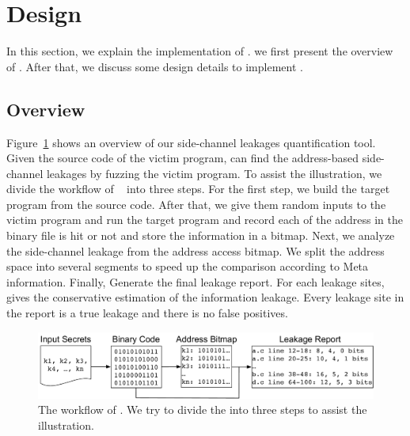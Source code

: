 \section{Design}
In this section, we explain the implementation of \ctool{}.
we first present the overview of \ctool{}. After that, we discuss some design details to implement \ctool{}.

\subsection{Overview}
Figure~\ref{chapter5:fig:workflow} shows an overview of our side-channel leakages quantification tool. Given the source code of the victim program, \ctool{} can find the address-based side-channel leakages by fuzzing the victim program. To assist the illustration, we divide the workflow of ~\ctool{} into three steps. For the first step, we build the target program from the source code. After that, we give them random inputs to the victim program and run the target program and record each of the address in the binary file is hit or not and store the information in a bitmap. Next, we analyze the side-channel leakage from the address access bitmap. We split the address space into several segments to speed up the comparison according to Meta information. Finally, \ctool{} Generate the final leakage report. For each leakage sites, \ctool{} gives the conservative estimation of the information leakage. Every leakage site in the report is a true leakage and there is no false positives.

\begin{figure}[ht]
  \centering
  \includegraphics[width=\columnwidth]{./figures/chapter5/workflow.pdf}
  \caption{The workflow of \ctool{}. We try to divide the \ctool{} into three steps to assist the illustration. }\label{chapter5:fig:workflow}
\end{figure}

